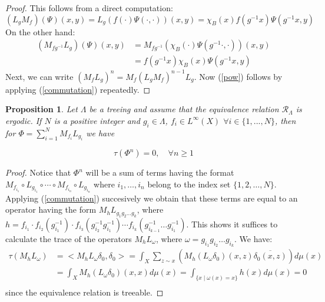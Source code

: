 \documentclass[12pt]{amsart}
\newtheorem{proposition}[teo]{Proposition}
\numberwithin{equation}{section}
\begin{document}
\begin{proof}
This follows from a direct computation:
\[
(L_{g}M_f)(\Psi)(x,y)=L_{g}(f(\cdot)\Psi(\cdot,\cdot))(x,y)=\chi_{B}(x)f(g^{-1}x)\Psi(g^{-1}x,y)
\]
On the other hand:
\begin{align*}
(M_{fg^{-1}}L_{g})(\Psi)(x,y)&=M_{fg^{-1}}(\chi_{B}(\cdot)\Psi(g^{-1}\cdot,\cdot))(x,y)\\
                                 &=f(g^{-1}x)\chi_{B}(x)\Psi(g^{-1}x,y)
\end{align*}
Next, we can write
$(M_fL_g)^n=M_f (L_gM_f)^{n-1}L_g$.
Now (\ref{pow}) follows by applying (\ref{commutation}) repeatedly.
\end{proof}


\begin{proposition}\label{trace}
Let  $\Lambda$ be a treeing and assume that the equivalence relation $\mathcal{R}_{\Lambda}$  is ergodic. If $N$ is a positive integer and $g_i\in\Lambda$, $f_i\in L^{\infty}(X)$  $\forall\mbox{} i\in\{1,...,N\}$, then for $\Phi=\sum_{i=1}^N M_{f_i}L_{g_i}$ we have

\[
\tau(\Phi^n)=0,\quad\forall n\geqslant 1
\]
\end{proposition}

\begin{proof}
Notice that $\Phi^n$ will be a sum of terms having the format $M_{f_{i_1}}\circ L_{g_{i_1}}\circ \cdots \circ M_{f_{i_n}}\circ L_{g_{i_n}}$ where $i_1,\ldots ,i_n$ belong to the index set $\{1,2,\ldots,N\}$. Applying (\ref{commutation}) succesively we obtain that these terms are equal to an operator having the form
$M_hL_{g_1 g_2\ldots g_k}$, where $h=f_{i_1}\cdot f_{i_2}(g_{i_1}^{-1})\cdot f_{i_3}(g_{i_2}^{-1}g_{i_1}^{-1})\cdots f_{i_k}(g_{i_{k-1}}^{-1}\ldots g_{i_1}^{-1})$.
This shows it suffices to calculate the trace of the operators $M_hL_{\omega}$, where  $\omega=g_{i_1}g_{i_2}\ldots g_{i_k}$.
We have:
\begin{align*}
\tau(M_hL_{\omega})&=<M_hL_{\omega}\delta_0,\delta_0>=\int_X \sum_{z\sim x} \left( M_h(L_\omega \delta_0)(x,z)\overline{\delta_0(x,z)} \right) d\mu(x)\\
&=\int_X M_h(L_{\omega}\delta_0)(x,x)d\mu(x) = \int_{\{x \mid \omega(x)=x\} } h(x) d\mu(x)=0\\
\end{align*}
since the equivalence relation is treeable.
\end{proof}
\end{document}
